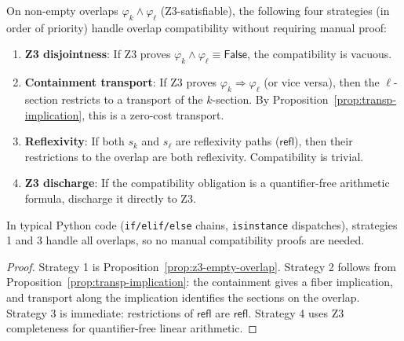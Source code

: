 \begin{proposition}
\label{prop:auto-compat}
On non-empty overlaps $\varphi_k \wedge \varphi_\ell$ (Z3-satisfiable),
the following four strategies (in order of priority) handle overlap
compatibility without requiring manual proof:
\begin{enumerate}
\item \textbf{Z3 disjointness}: If Z3 proves $\varphi_k \wedge \varphi_\ell
  \equiv \mathsf{False}$, the compatibility is vacuous.
\item \textbf{Containment transport}: If Z3 proves $\varphi_k \Rightarrow
  \varphi_\ell$ (or vice versa), then the $\ell$-section restricts to a
  transport of the $k$-section.  By
  Proposition~\ref{prop:transp-implication}, this is a zero-cost transport.
\item \textbf{Reflexivity}: If both $s_k$ and $s_\ell$ are reflexivity
  paths ($\mathsf{refl}$), then their restrictions to the overlap are both
  reflexivity.  Compatibility is trivial.
\item \textbf{Z3 discharge}: If the compatibility obligation is a
  quantifier-free arithmetic formula, discharge it directly to Z3.
\end{enumerate}
In typical Python code (\texttt{if/elif/else} chains, \texttt{isinstance}
dispatches), strategies 1 and 3 handle all overlaps, so no manual
compatibility proofs are needed.
\end{proposition}

\begin{proof}
Strategy 1 is Proposition~\ref{prop:z3-empty-overlap}.  Strategy 2 follows
from Proposition~\ref{prop:transp-implication}: the containment gives a
fiber implication, and transport along the implication identifies the
sections on the overlap.  Strategy 3 is immediate: restrictions of $\mathsf{refl}$
are $\mathsf{refl}$.  Strategy 4 uses Z3 completeness for quantifier-free
linear arithmetic.
\end{proof}

